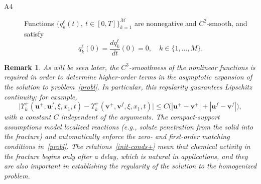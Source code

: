\documentclass[reqno]{amsart}            %
\newtheorem{remark}{Remark}[section]
\numberwithin{equation}{section}
\begin{document}
	\begin{description}
		\item[A4]
		Functions  $\{q^\ell_k(t), \ t\in [0, T]\}_{k=1}^\mathcal{M} $ are nonnegative and $C^2$-smooth, and satisfy 
		\begin{equation}\label{match_conditions}
			q^\ell_k(0) =  \frac{d q^\ell_k}{dt}(0) = 0, \quad k\in \{1,\ldots,M\}.
		\end{equation}
	\end{description}
	\begin{remark}\label{rem-2-3}
		As will be seen later, the $C^3$-smoothness of the nonlinear functions is required in order to determine 
		higher-order terms in the asymptotic expansion of the solution to problem~\eqref{probl}. 
		In particular, this regularity guarantees Lipschitz continuity; for example,
		\begin{equation}\label{Lip-ineq}
			\big|\Upsilon^+_k(\mathbf{u}^+, \mathbf{u}^f, \xi, x_1,t) 
			- \Upsilon^+_k(\mathbf{v}^+, \mathbf{v}^f, \xi, x_1,t)\big|
			\le C\big(|\mathbf{u}^+ - \mathbf{v}^+| + |\mathbf{u}^f - \mathbf{v}^f|\big),
		\end{equation}
		with a constant $C$ independent of the arguments. 
		The compact-support assumptions model localized reactions (e.g., solute penetration from the solid into the fracture) 
		and automatically enforce the zero- and first-order matching conditions in~\eqref{probl}. 
		The relations~\eqref{init-conds+} mean that chemical activity in the fracture begins only after a delay, 
		which is natural in applications, and they are also important  in establishing the regularity of the solution 
		to the homogenized problem.
	\end{remark}
	
\end{document}
